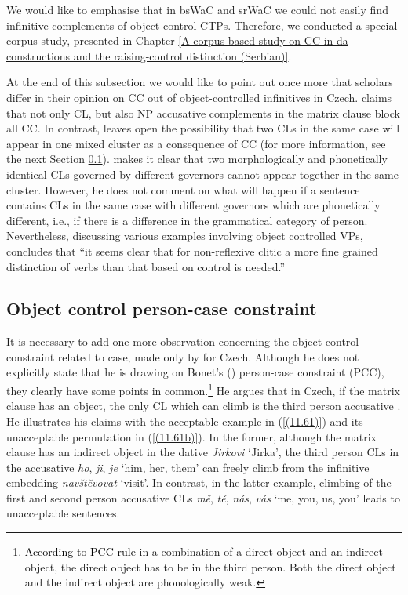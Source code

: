 We would like to emphasise that in bsWaC and srWaC we could not easily find infinitive complements of object control CTPs. Therefore, we conducted a special corpus study, presented in Chapter \ref{A corpus-based study on CC in da constructions and the raising-control distinction (Serbian)}. 

At the end of this subsection we would like to point out once more that scholars differ in their opinion on CC out of object-controlled infinitives in Czech. \citet[18]{Rezac05} claims that not only CL, but also NP accusative complements in the matrix clause block all CC. In contrast, \citet[81]{Dotlacil04} leaves open the possibility that two CLs in the same case will appear in one mixed cluster as a consequence of CC (for more information, see the next Section \ref{Object control person-case constraint}). \citet[123]{Hana07} makes it clear that two morphologically and phonetically identical CLs governed by different governors cannot appear together in the same cluster. However, he does not comment on what will happen if a sentence contains CLs in the same case with different governors which are phonetically different, i.e., if there is a difference in the grammatical category of person. Nevertheless, discussing various examples involving object controlled VPs, \citet[130]{Hana07} concludes that “it seems clear that for non-reflexive clitic a more fine grained distinction of verbs than that based on control is needed.”

\subsection{Object control person-case constraint}
\label{Object control person-case constraint}

It is necessary to add one more observation concerning the object control constraint related to case, made only by \citet{Dotlacil04} for Czech. Although he does not explicitly state that he is drawing on Bonet’s (\citeyear{Bonet91, Bonet94}) person-case constraint (PCC), they clearly have some points in common.\footnote{\textcolor{black}{According to PCC rule} in a combination of a direct object and an indirect object, the direct object has to be in the third person. Both the direct object and the indirect object are phonologically weak.} He argues that in Czech, if the matrix clause has an object, the only CL which can climb is the third person accusative \citep[cf.][79ff]{Dotlacil04}. He illustrates his claims with the acceptable example in (\ref{(11.61)}) and its unacceptable permutation in (\ref{(11.61b)}). In the former, although the matrix clause has an indirect object in the dative \textit{Jirkovi} ‘Jirka’, the third person CLs in the accusative \textit{ho}, \textit{ji}, \textit{je} `him, her, them’ can freely climb from the infinitive embedding \textit{navštěvovat} ‘visit’. In contrast, in the latter example, climbing of the first and second person accusative CLs \textit{mě}, \textit{tě}, \textit{nás}, \textit{vás} ‘me, you, us, you’ leads to unacceptable sentences.

